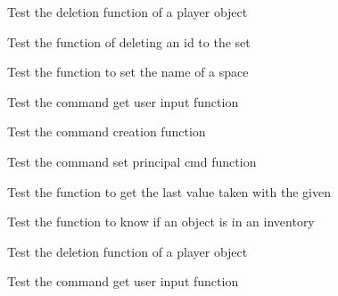 \begin{DoxyRefList}
\item[\label{test__test000122}%
\Hypertarget{test__test000122}%
Global \hyperlink{player__test_8c_aed6b8d0d4b733a8182faef777d6bb4d7}{test3\+\_\+player\+\_\+dell\+\_\+object} ()]Test the deletion function of a player object  
\item[\label{test__test000144}%
\Hypertarget{test__test000144}%
Global \hyperlink{set__test_8c_a3891f28cf2daa0da4811e667cac542cb}{test3\+\_\+set\+\_\+dell} ()]Test the function of deleting an id to the set  
\item[\label{test__test000155}%
\Hypertarget{test__test000155}%
Global \hyperlink{space__test_8c_aa24a337830006e33706ab6ac1c416b47}{test3\+\_\+space\+\_\+set\+\_\+name} ()]Test the function to set the name of a space  
\item[\label{test__test000028}%
\Hypertarget{test__test000028}%
Global \hyperlink{command__test_8c_a87e1a266b9beb6b31dd8e626694d5dd6}{test4\+\_\+command\+\_\+get\+\_\+user\+\_\+input} ()]Test the command get user input function  
\item[\label{test__test000004}%
\Hypertarget{test__test000004}%
Global \hyperlink{command__test_8c_a6367528b38336d716e765ea2d57f6d8c}{test4\+\_\+command\+\_\+init} ()]Test the command creation function  
\item[\label{test__test000008}%
\Hypertarget{test__test000008}%
Global \hyperlink{command__test_8c_a0485be612e6f281fe6e5b4dc778e2b72}{test4\+\_\+command\+\_\+set\+\_\+principal\+\_\+cmd} ()]Test the command set principal cmd function  
\item[\label{test__test000056}%
\Hypertarget{test__test000056}%
Global \hyperlink{dice__test_8c_acfd69ccf21566f11ea0ccb8cc2f592ab}{test4\+\_\+dice\+\_\+get\+\_\+last} ()]Test the function to get the last value taken with the given  
\item[\label{test__test000070}%
\Hypertarget{test__test000070}%
Global \hyperlink{inventory__test_8c_a257dbc0f18af4e4f73163014faa0783a}{test4\+\_\+inventory\+\_\+is\+\_\+object} ()]Test the function to know if an object is in an inventory  
\item[\label{test__test000123}%
\Hypertarget{test__test000123}%
Global \hyperlink{player__test_8c_a27b5f30b6faa1d0bf8eb97fa9083a8e2}{test4\+\_\+player\+\_\+dell\+\_\+object} ()]Test the deletion function of a player object  
\item[\label{test__test000029}%
\Hypertarget{test__test000029}%
Global \hyperlink{command__test_8c_a3b7a4bfd103971720b0daef936b9251c}{test5\+\_\+command\+\_\+get\+\_\+user\+\_\+input} ()]Test the command get user input function  

\end{DoxyRefList}
